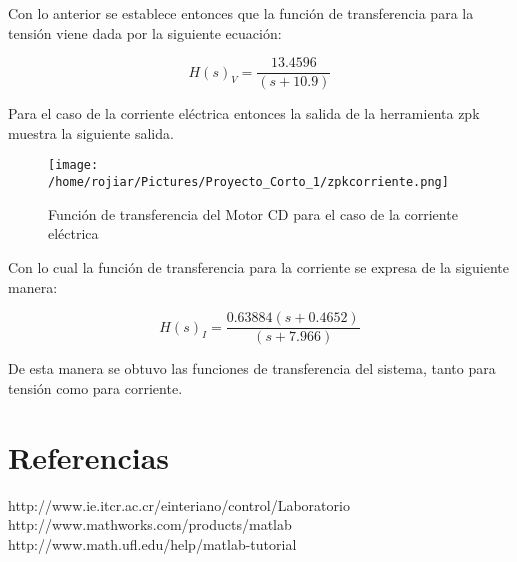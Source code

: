 \documentclass[a4paper,10pt,twocolumn]{article}
\begin{document}
Con lo anterior se establece entonces que la función de transferencia para la tensión viene dada por la siguiente ecuación:


\begin{center}
$$
 H(s)_V = \frac{13.4596}{(s+10.9)}
$$  
\end{center}

\newpage
Para el caso de la corriente eléctrica entonces la salida de la herramienta zpk muestra la siguiente salida.

\begin{figure}[h!]
\centering
\texttt{[image: /home/rojiar/Pictures/Proyecto\_Corto\_1/zpkcorriente.png]}
\caption{Función de transferencia del Motor CD para el caso de la corriente eléctrica}
\label{Funcion de transferencia del Motor CD para el caso de la corriente electrica}
\end{figure}

Con lo cual la función de transferencia para la corriente se expresa de la siguiente manera:

\begin{center}
$$
 H(s)_I = \frac{0.63884 (s+0.4652)}{(s+7.966)}
$$  
\end{center}

De esta manera se obtuvo las funciones de transferencia del sistema, tanto para tensión como para corriente.

\section{Referencias}

http://www.ie.itcr.ac.cr/einteriano/control/Laboratorio
http://www.mathworks.com/products/matlab\\
http://www.math.ufl.edu/help/matlab-tutorial
\end{document}
